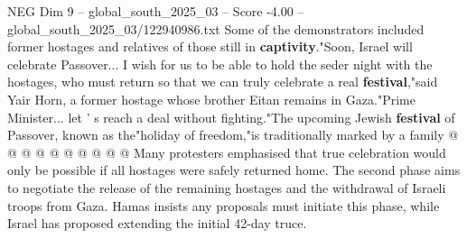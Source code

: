 \begin{textsample}{NEG Dim 9 – global\_south\_2025\_03 – Score -4.00 – global\_south\_2025\_03/122940986.txt}
Some of the demonstrators included former hostages and relatives of those still in \textbf{captivity}."Soon, Israel will celebrate Passover...
I wish for us to be able to hold the seder night with the hostages, who must return so that we can truly celebrate a real \textbf{festival},"said Yair Horn, a former hostage whose brother Eitan remains in Gaza."Prime Minister... let ' s reach a deal without fighting."The upcoming Jewish \textbf{festival} of Passover, known as the"holiday of freedom,"is traditionally marked by a family @ @ @ @ @ @ @ @ @ @ Many protesters emphasised that true celebration would only be possible if all hostages were safely returned home.
The second phase aims to negotiate the release of the remaining hostages and the withdrawal of Israeli troops from Gaza.
Hamas insists any proposals must initiate this phase, while Israel has proposed extending the initial 42-day truce.

\end{textsample}
